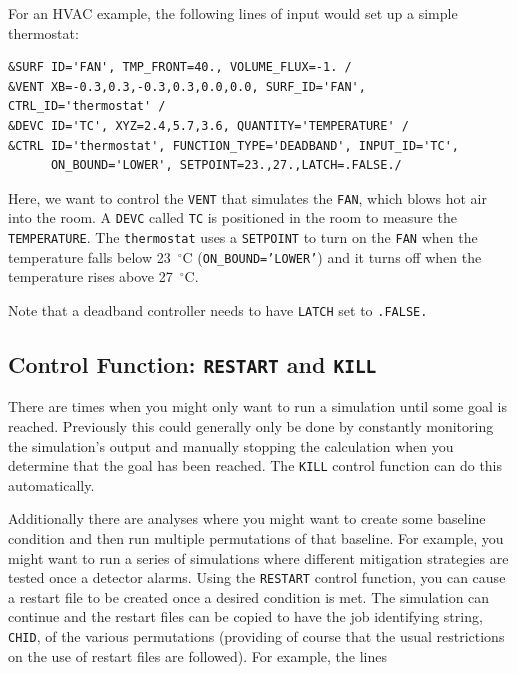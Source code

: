 \documentclass[11pt]{book}
\newcommand{\ct}{\tt\small}
\begin{document}
For an HVAC example, the following lines of input would set up a simple thermostat:

\footnotesize
\begin{verbatim}
&SURF ID='FAN', TMP_FRONT=40., VOLUME_FLUX=-1. /
&VENT XB=-0.3,0.3,-0.3,0.3,0.0,0.0, SURF_ID='FAN', CTRL_ID='thermostat' /
&DEVC ID='TC', XYZ=2.4,5.7,3.6, QUANTITY='TEMPERATURE' /
&CTRL ID='thermostat', FUNCTION_TYPE='DEADBAND', INPUT_ID='TC',
      ON_BOUND='LOWER', SETPOINT=23.,27.,LATCH=.FALSE./
\end{verbatim} \normalsize

\noindent
Here, we want to control the {\ct VENT} that simulates the {\ct FAN}, which blows hot air
into the room. A {\ct DEVC} called {\ct TC} is positioned in the room to measure the {\ct TEMPERATURE}.
The {\ct thermostat} uses a {\ct SETPOINT} to turn on the
{\ct FAN} when the temperature falls below 23~$^\circ$C ({\ct ON\_BOUND='LOWER'})
and it turns off when the temperature rises above 27~$^\circ$C.

\begin{warning}
Note that a deadband controller needs to have {\ct LATCH} set to {\ct .FALSE.}
\end{warning}

\subsection{Control Function: \texorpdfstring{{\tt RESTART} and {\tt KILL}} {RESTARTKILL} }

There are times when you might only want to run a simulation until some
goal is reached.  Previously this could generally only be done by
constantly monitoring the simulation's output and manually stopping
the calculation when you determine that the goal has been reached.  The
{\ct KILL} control function can do this automatically.

Additionally there are analyses where you might want to create some
baseline condition and then run multiple permutations of that baseline.
For example, you might want to run a series of simulations where
different mitigation strategies are tested once a detector alarms.
Using the {\ct RESTART}
control function, you can cause a restart file
to be created once a desired condition is met.  The simulation can
continue and the restart files can be copied to have the job identifying string, {\ct CHID}, of
the various permutations (providing of course that the usual
restrictions on the use of restart files are followed).
For example, the lines
\end{document}
